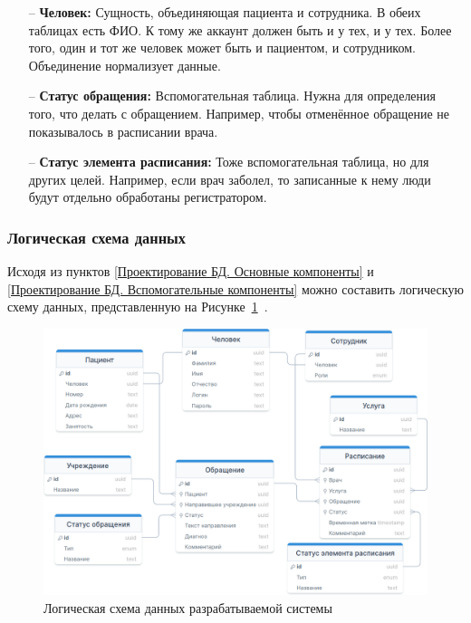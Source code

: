 \documentclass[a4paper,article]{article}
\begin{document}
\begin{sloppypar}
    \begin{itemize}[nolistsep]
        \item[--] \textbf{Человек:} Сущность, объединяющая пациента и сотрудника. В обеих таблицах есть ФИО. К тому же аккаунт должен быть и у тех, и у тех. Более того, один и тот же человек может быть и пациентом, и сотрудником. Объединение нормализует данные.
        \item[--] \textbf{Статус обращения:} Вспомогательная таблица. Нужна для определения того, что делать с обращением. Например, чтобы отменённое обращение не показывалось в расписании врача.
        \item[--] \textbf{Статус элемента расписания:} Тоже вспомогательная таблица, но для других целей. Например, если врач заболел, то записанные к нему люди будут отдельно обработаны регистратором.
    \end{itemize}

    \subsubsection{Логическая схема данных}

    Исходя из пунктов \ref{Проектирование БД. Основные компоненты} и \ref{Проектирование БД. Вспомогательные компоненты} можно составить логическую схему данных, представленную на Рисунке~\ref{fig:Логическая схема данных}~\cite{dbdiag}.

    \begin{figure}[h]
        \centering
        \includegraphics[width=0.9\linewidth]{Логическая схема данных.png}
        \caption{\centering Логическая схема данных разрабатываемой системы}
        \label{fig:Логическая схема данных}
    \end{figure}


\end{sloppypar}
\end{document}
